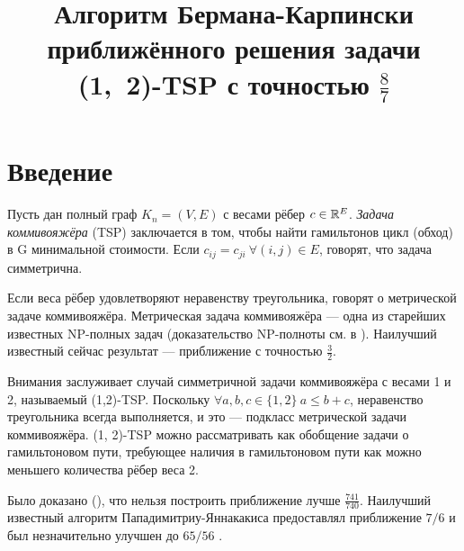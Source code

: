 

\usepackage[]{algorithm2e}


\usepackage{tikz}
\newcommand*\circled[1]{\tikz[baseline=(char.base)]{
		\node[shape=circle,draw,inner sep=1pt] (char) {#1};}}
	
\newtheorem{theorem}{Теорема}

\renewcommand{\G}{\mathcal{G}}


\title{Алгоритм Бермана-Карпински приближённого решения задачи \mbox{(1, 2)-TSP} с точностью $\frac{8}{7}$}
\date{}
\author{}

\maketitle

%

\section{Введение}
Пусть дан полный граф $K_n = (V, E)$ с весами рёбер $c \in \mathbb{R}^E$. \textit{Задача коммивояжёра} (TSP) заключается в том, чтобы найти гамильтонов цикл (обход) в G минимальной стоимости. Если $c_{ij} = c_{ji}\ \forall (i, j)  \in E$, говорят, что задача симметрична. 

Если веса рёбер удовлетворяют неравенству треугольника, говорят о метрической задаче коммивояжёра. Метрическая задача коммивояжёра --- одна из старейших известных NP-полных задач (доказательство NP-полноты см. в \cite{JP85}). Наилучший известный сейчас результат --- приближение с точностью $\frac{3}{2}$\cite{C76}. 

Внимания заслуживает случай симметричной задачи коммивояжёра с весами 1 и 2, называемый (1,2)-TSP. Поскольку $\forall a, b, c \in \{1, 2\} \ a\le b+c$, неравенство треугольника всегда выполняется, и это --- подкласс метрической задачи коммивояжёра. (1, 2)-TSP можно рассматривать как обобщение задачи о гамильтоновом пути, требующее наличия в гамильтоновом пути как можно меньшего количества рёбер веса 2.

Было доказано (\cite{EK01}), что нельзя построить приближение лучше $\frac{741}{740}$. Наилучший известный алгоритм Пападимитриу-Яннакакиса \cite{PY93} предоставлял приближение $7/6$ и был незначительно улучшен до $65/56$ \cite{BR05}. 

